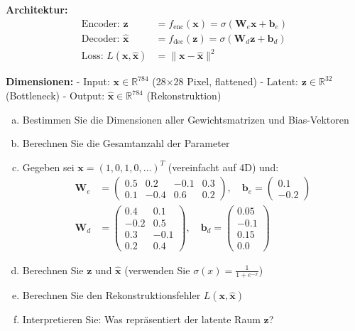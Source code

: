 \documentclass[12pt,a4paper]{article}
\begin{document}
\textbf{Architektur:}
\begin{align}
\text{Encoder: } \mathbf{z} &= f_{\text{enc}}(\mathbf{x}) = \sigma(\mathbf{W}_e \mathbf{x} + \mathbf{b}_e) \\
\text{Decoder: } \hat{\mathbf{x}} &= f_{\text{dec}}(\mathbf{z}) = \sigma(\mathbf{W}_d \mathbf{z} + \mathbf{b}_d) \\
\text{Loss: } L(\mathbf{x}, \hat{\mathbf{x}}) &= \|\mathbf{x} - \hat{\mathbf{x}}\|^2
\end{align}

\textbf{Dimensionen:}
- Input: $\mathbf{x} \in \mathbb{R}^{784}$ (28×28 Pixel, flattened)
- Latent: $\mathbf{z} \in \mathbb{R}^{32}$ (Bottleneck)
- Output: $\hat{\mathbf{x}} \in \mathbb{R}^{784}$ (Rekonstruktion)

\begin{enumerate}[(a)]
    \item Bestimmen Sie die Dimensionen aller Gewichtsmatrizen und Bias-Vektoren
    \item Berechnen Sie die Gesamtanzahl der Parameter
    \item Gegeben sei $\mathbf{x} = (1, 0, 1, 0, \ldots)^T$ (vereinfacht auf 4D) und:
    \begin{align}
    \mathbf{W}_e &= \begin{pmatrix} 0.5 & 0.2 & -0.1 & 0.3 \\ 0.1 & -0.4 & 0.6 & 0.2 \end{pmatrix}, \quad 
    \mathbf{b}_e = \begin{pmatrix} 0.1 \\ -0.2 \end{pmatrix} \\
    \mathbf{W}_d &= \begin{pmatrix} 0.4 & 0.1 \\ -0.2 & 0.5 \\ 0.3 & -0.1 \\ 0.2 & 0.4 \end{pmatrix}, \quad 
    \mathbf{b}_d = \begin{pmatrix} 0.05 \\ -0.1 \\ 0.15 \\ 0.0 \end{pmatrix}
    \end{align}
    \item Berechnen Sie $\mathbf{z}$ und $\hat{\mathbf{x}}$ (verwenden Sie $\sigma(x) = \frac{1}{1+e^{-x}}$)
    \item Berechnen Sie den Rekonstruktionsfehler $L(\mathbf{x}, \hat{\mathbf{x}})$
    \item Interpretieren Sie: Was repräsentiert der latente Raum $\mathbf{z}$?
\end{enumerate}
\end{document}
